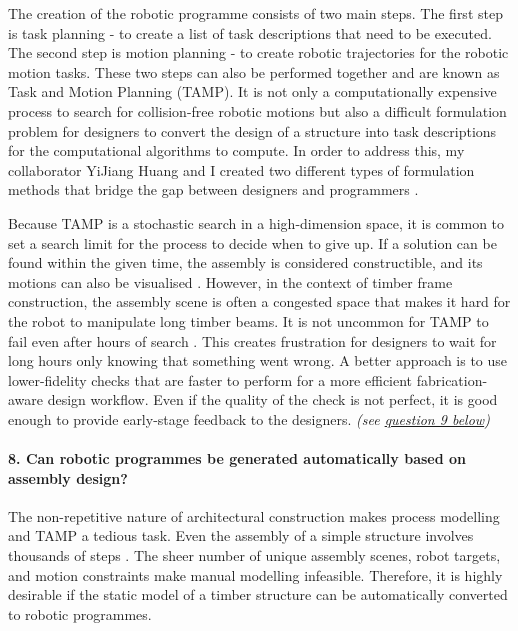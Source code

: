 The creation of the robotic programme consists of two main steps. The first step is task planning - to create a list of task descriptions that need to be executed. The second step is motion planning - to create robotic trajectories for the robotic motion tasks. These two steps can also be performed together and are known as Task and Motion Planning (TAMP). It is not only a computationally expensive process to search for collision-free robotic motions but also a difficult formulation problem for designers to convert the design of a structure into task descriptions for the computational algorithms to compute. In order to address this, my collaborator YiJiang Huang and I created two different types of formulation methods that bridge the gap between designers and programmers .

Because TAMP is a stochastic search in a high-dimension space, it is common to set a search limit for the process to decide when to give up. If a solution can be found within the given time, the assembly is considered constructible, and its motions can also be visualised . However, in the context of timber frame construction, the assembly scene is often a congested space that makes it hard for the robot to manipulate long timber beams. It is not uncommon for TAMP to fail even after hours of search . This creates frustration for designers to wait for long hours only knowing that something went wrong. A better approach is to use lower-fidelity checks that are faster to perform for a more efficient fabrication-aware design workflow. Even if the quality of the check is not perfect, it is good enough to provide early-stage feedback to the designers. \textit{(see \ul{question 9 below})}

\paragraph{8. Can robotic programmes be generated automatically based on assembly design?}

The non-repetitive nature of architectural construction makes process modelling and TAMP a tedious task. Even the assembly of a simple structure involves thousands of steps . The sheer number of unique assembly scenes, robot targets, and motion constraints make manual modelling infeasible. Therefore, it is highly desirable if the static model of a timber structure can be automatically converted to robotic programmes.

